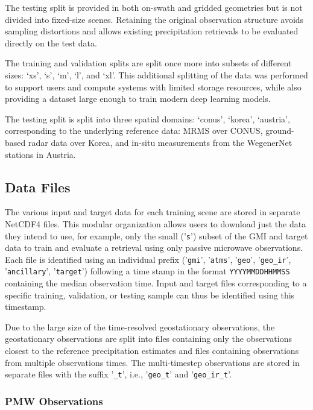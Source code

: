 \documentclass[11pt]{article}
\begin{document}
The testing split is provided in both on-swath and gridded geometries but is not
divided into fixed-size scenes. Retaining the original observation structure
avoids sampling distortions and allows existing precipitation retrievals to be
evaluated directly on the test data.

The training and validation splits are split once more into subsets of different sizes: ‘xs’, ‘s’, ‘m’, ‘l’, and ‘xl’. This additional splitting of the data was performed to support users and compute systems with limited storage resources, while also providing a dataset large enough to train modern deep learning models.

The testing split is split into three spatial domains: ‘conus’, ‘korea’, ‘austria’, corresponding to the underlying reference data: MRMS over CONUS, ground-based radar data over Korea, and in-situ measurements from the WegenerNet stations in Austria.

\subsection{Data Files}

The various input and target data for each training scene are stored in separate
NetCDF4 files. This modular organization allows users to download just the data
they intend to use, for example, only the small ('\texttt{s}') subset of the GMI
and target data to train and evaluate a retrieval using only passive microwave
observations. Each file is identified using an individual prefix
('\texttt{gmi}', '\texttt{atms}', '\texttt{geo}', '\texttt{geo\_ir}',
'\texttt{ancillary}', '\texttt{target}') following a time stamp in the format
\texttt{YYYYMMDDHHMMSS} containing the median observation time. Input and target
files corresponding to a specific training, validation, or testing sample can
thus be identified using this timestamp.

Due to the large size of the time-resolved geostationary observations, the
geostationary observations are split into files containing only the observations
closest to the reference precipitation estimates and files containing
observations from multiple observations times. The multi-timestep observations
are stored in separate files with the suffix '\texttt{\_t}', i.e.,
'\texttt{geo\_t}' and '\texttt{geo\_ir\_t}'.

\subsubsection{PMW Observations}
\end{document}
